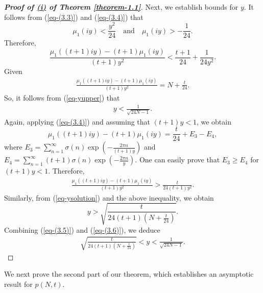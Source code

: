 \documentclass[11pt]{amsart}
\theoremstyle{plain}
\numberwithin{equation}{section}
\begin{document}
\begin{proof}[\textbf{\boldmath Proof of  \hyperlink{thm1.1i}{(i)} of Theorem \ref{theorem-1.1}}]
			Next, we establish bounds for $y$. It follows from (\ref{eq-(3.3)}) and (\ref{eq-(3.4)}) that
			\begin{equation*}
				\mu_1(iy)< \frac{y^{2}}{24} \quad\text{and}\quad  \mu_{1}(iy)>-\frac{1}{24}.
			\end{equation*}
			Therefore,
			\begin{equation}\label{eq-yupper}
				\frac{\mu_{1}((t+1)iy) - (t+1)\mu_{1}(iy)}{(t+1)y^{2}} < \frac{t+1}{24} + \frac{1}{24y^{2}}.
			\end{equation}
			Given 
			\begin{align}\label{eq-ysolution}
				\frac{\mu_{1}((t+1)iy) - (t+1)\mu_{1}(iy)}{(t+1)y^{2}}=N+\frac{t}{24}.
			\end{align}
			So, it follows from (\ref{eq-yupper}) that
			\begin{align}\label{eq-(3.5)}
				y < \frac{1}{\sqrt{24N - 1}}.
			\end{align}
			Again, applying (\ref{eq-(3.4)}) and assuming that $(t+1)y<1$, we obtain
			\begin{equation*}
				\mu_{1}((t+1)iy) - (t+1)\mu_{1}(iy) = \frac{t}{24}+E_3-E_4 , 
			\end{equation*}
			where $E_3=\sum_{n=1}^{\infty}\sigma(n)\exp\left(-\frac{2\pi n}{(t+1)y}\right)$ and $E_4=\sum_{n=1}^{\infty}(t+1)\sigma(n)\exp\left(-\frac{2\pi n}{y}\right)$. One can easily prove that $E_3 \ge E_4$ for $(t+1)y < 1$. Therefore, 
			\begin{align*}%
				\frac{\mu_{1}((t+1)iy) - (t+1)\mu_{1}(iy)}{(t+1)y^{2}} > \frac{t}{24(t+1)y^{2}}.
			\end{align*}
			Similarly, from (\ref{eq-ysolution}) and the above inequality, we obtain
			\begin{equation}\label{eq-(3.6)}
				y>\sqrt{\frac{t}{24(t+1)\left(N + \frac{t}{24}\right)}} .   
			\end{equation} 
			Combining (\ref{eq-(3.5)}) and (\ref{eq-(3.6)}), we deduce
			\begin{align*}
				\sqrt{\frac{t}{24(t+1)\left(N + \frac{t}{24}\right)}} <y < \frac{1}{\sqrt{24N - 1}}.  
			\end{align*}
		\end{proof}
		We next prove the second part of our theorem, which establishes an asymptotic result for $p(N,t).$
\end{document}

